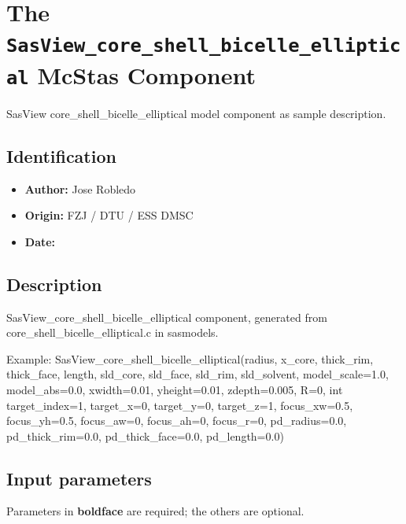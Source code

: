 \section{The \texttt{SasView\_core\_shell\_bicelle\_elliptical} McStas Component}
SasView core\_shell\_bicelle\_elliptical model component as sample description.

\subsection*{Identification}
\begin{itemize}
  \item \textbf{Author:} Jose Robledo
  \item \textbf{Origin:} FZJ / DTU / ESS DMSC
  \item \textbf{Date:} 
\end{itemize}

\subsection*{Description}
SasView\_core\_shell\_bicelle\_elliptical component, generated from core\_shell\_bicelle\_elliptical.c in sasmodels.

Example: SasView\_core\_shell\_bicelle\_elliptical(radius, x\_core, thick\_rim, thick\_face, length, sld\_core, sld\_face, sld\_rim, sld\_solvent, model\_scale=1.0, model\_abs=0.0, xwidth=0.01, yheight=0.01, zdepth=0.005, R=0, int target\_index=1, target\_x=0, target\_y=0, target\_z=1, focus\_xw=0.5, focus\_yh=0.5, focus\_aw=0, focus\_ah=0, focus\_r=0, pd\_radius=0.0, pd\_thick\_rim=0.0, pd\_thick\_face=0.0, pd\_length=0.0)

\subsection*{Input parameters}
Parameters in \textbf{boldface} are required; the others are optional.

